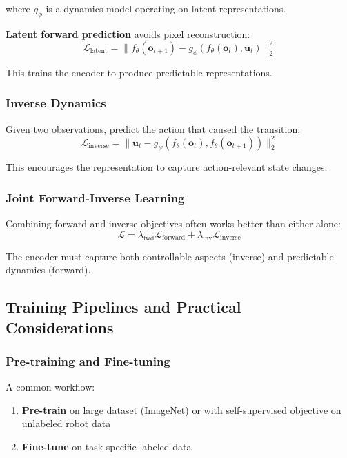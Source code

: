 where $g_\phi$ is a dynamics model operating on latent representations.

\textbf{Latent forward prediction} avoids pixel reconstruction:
\begin{equation}
\mathcal{L}_{\text{latent}} = \| f_\theta(\mathbf{o}_{t+1}) - g_\phi(f_\theta(\mathbf{o}_t), \mathbf{u}_t) \|_2^2
\label{eq:latent_forward}
\end{equation}

This trains the encoder to produce predictable representations.

\subsubsection{Inverse Dynamics}

Given two observations, predict the action that caused the transition:
\begin{equation}
\mathcal{L}_{\text{inverse}} = \| \mathbf{u}_t - g_\psi(f_\theta(\mathbf{o}_t), f_\theta(\mathbf{o}_{t+1})) \|_2^2
\label{eq:inverse_dynamics}
\end{equation}

This encourages the representation to capture action-relevant state changes.

\subsubsection{Joint Forward-Inverse Learning}

Combining forward and inverse objectives often works better than either alone:
\begin{equation}
\mathcal{L} = \lambda_{\text{fwd}} \mathcal{L}_{\text{forward}} + \lambda_{\text{inv}} \mathcal{L}_{\text{inverse}}
\label{eq:joint_fwd_inv}
\end{equation}

The encoder must capture both controllable aspects (inverse) and predictable dynamics (forward).

\subsection{Training Pipelines and Practical Considerations}

\subsubsection{Pre-training and Fine-tuning}

A common workflow:
\begin{enumerate}
    \item \textbf{Pre-train} on large dataset (ImageNet) or with self-supervised objective on unlabeled robot data
    \item \textbf{Fine-tune} on task-specific labeled data
\end{enumerate}

